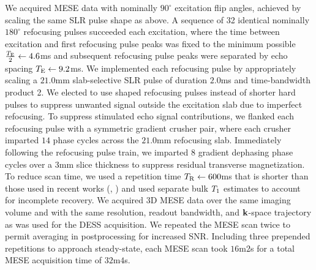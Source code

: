We acquired MESE data
with nominally $90^\circ$ excitation flip angles,
achieved by scaling the same SLR pulse shape as above.
A sequence of 32 identical nominally $180^\circ$ refocusing pulses
succeeded each excitation,
where the time between excitation and first refocusing pulse peaks
was fixed to the minimum possible $\frac{T_\mathrm{E}}{2} \gets 4.6$ms
and subsequent refocusing pulse peaks were separated
by echo spacing $T_\mathrm{E} \gets 9.2$ms.
We implemented each refocusing pulse
by appropriately scaling a $21.0$mm slab-selective SLR pulse
of duration $2.0$ms 
and time-bandwidth product 2.
We elected to use shaped refocusing pulses
instead of shorter hard pulses
to suppress unwanted signal outside the excitation slab
due to imperfect refocusing.
To suppress stimulated echo signal contributions,
we flanked each refocusing pulse
with a symmetric gradient crusher pair,
where each crusher imparted $14$ phase cycles
across the $21.0$mm refocusing slab.
Immediately following the refocusing pulse train,
we imparted $8$ gradient dephasing phase cycles 
over a $3$mm slice thickness
to suppress residual transverse magnetization.
To reduce scan time,
we used a repetition time $T_\mathrm{R} \gets 600$ms
that is shorter than those used
in recent works (\eg, \cite{prasloski:12:rwc,zhang:15:com})
and used separate bulk $T_1$ estimates
to account for incomplete recovery.
We acquired 3D MESE data 
over the same imaging volume
and with the same resolution, readout bandwidth, and $\mathbf{k}$-space trajectory
as was used for the DESS acquisition.
We repeated the MESE scan twice
to permit averaging in postprocessing 
for increased SNR.
Including three prepended repetitions to approach steady-state,
each MESE scan took $16$m$2$s
for a total MESE acquisition time of $32$m$4$s.

